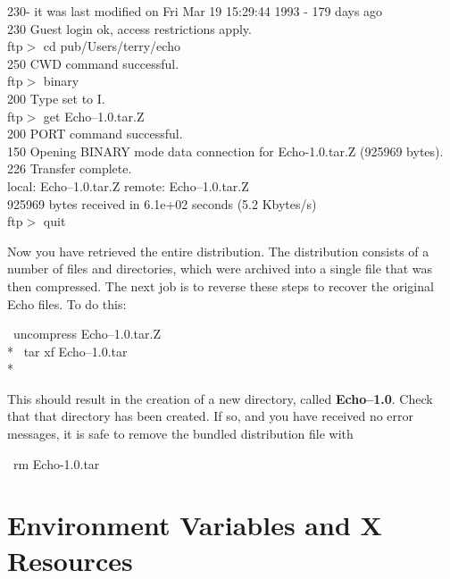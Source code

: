 \begin{sl}
230-  it was last modified on Fri Mar 19 15:29:44 1993 - 179 days ago		\\
230 Guest login ok, access restrictions apply.					\\
ftp$>$ {\sf cd pub/Users/terry/echo}      					\\
250 CWD command successful.							\\
ftp$>$ {\sf binary}								\\
200 Type set to I.								\\
ftp$>$ {\sf get Echo--1.0.tar.Z}                                                \\
200 PORT command successful.                                                    \\
150 Opening BINARY mode data connection for Echo-1.0.tar.Z (925969 bytes).      \\
226 Transfer complete.						                \\
local: Echo--1.0.tar.Z remote: Echo--1.0.tar.Z			                \\
925969 bytes received in 6.1e+02 seconds (5.2 Kbytes/s)                         \\
ftp$>$ {\sf quit}                                                               \\
\end{sl}

Now you have retrieved the entire distribution. The distribution
consists of a number of files and directories, which were archived
into a single file that was then compressed. The next job is to
reverse these steps to recover the original Echo files.  To do this:

\begin{shell}
\prompt\ uncompress Echo--1.0.tar.Z \\*
\prompt\ tar xf Echo--1.0.tar \\*
\end{shell}

This should result in the creation of a new directory, called {\bf
Echo--1.0}. Check that that directory has been created. If so, and you
have received no error messages, it is safe to remove the bundled
distribution file with

\begin{shell}
\prompt\ rm Echo-1.0.tar
\end{shell}

\newpage
\section{Environment Variables and X Resources}
\label{setting-up}

